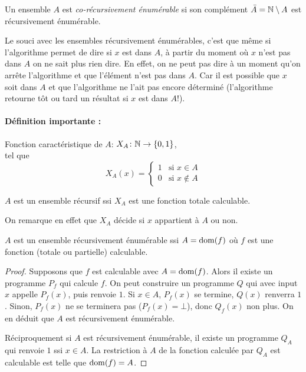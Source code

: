 \begin{mydef}
  Un ensemble $A$ est \emph{co-récursivement énumérable}
  si son complément $\bar{A} = \mathbb{N} \setminus A$ est récursivement énumérable.
\end{mydef}

\begin{myrem}
	Le souci avec les ensembles récursivement énumérables,
	c'est que même si l'algorithme permet de dire si $x$ est dans $A$, à partir du moment où $x$
	n'est pas dans $A$ on ne sait plus rien dire. En effet, on ne peut pas dire à un moment qu'on
	arrête l'algorithme et que l'élément n'est pas dans $A$.
       	Car il est possible que $x$ soit dans $A$ et que l'algorithme ne
	l'ait pas encore déterminé (l'algorithme retourne tôt ou tard un
	résultat si $x$ est dans $A$!).
\end{myrem}

\paragraph{Définition importante :}
\label{par:d_finition_importante}

\begin{mydef}
	Fonction caractéristique de $A$:
	$X_A \colon \mathbb{N} \to \{0,1\}$, \\
	tel que
    \[ X_A(x) =
      \begin{cases}
        1 & \text{si }x \in A \\
        0 & \text{si }x \notin A
      \end{cases}
    \]
\end{mydef}

\begin{myprop}
	$A$ est un ensemble récursif ssi $X_A$ est une fonction totale	calculable.

    On remarque en effet que $X_A$ décide si $x$ appartient à $A$ ou non.
\end{myprop}

\begin{myprop}
	$A$ est un ensemble récursivement énumérable ssi $A = \operatorname{dom}(f)$ où $f$ est une fonction (totale ou partielle) calculable.

    \begin{proof}
      Supposons que $f$ est calculable avec $A=\operatorname{dom}(f)$. Alors
      il existe un programme $P_f$ qui calcule $f$.
      On peut construire un programme $Q$ qui avec input $x$
      appelle $P_f(x)$, puis renvoie $1$.
      Si $x\in A$, $P_f(x)$ se termine, $Q(x)$ renverra $1$. Sinon, $P_f(x)$ ne se terminera pas ($P_f(x) =\bot$), donc $Q_f(x)$ non plus. On en déduit que $A$ est récursivement énumérable.

      Réciproquement si $A$ est récursivement énumérable, il existe un programme $Q_A$ qui renvoie $1$ ssi $x\in A$. La restriction à $A$ de la fonction calculée par $Q_A$ est calculable est telle que $\operatorname{dom}(f) = A$.
    \end{proof}
\end{myprop}

